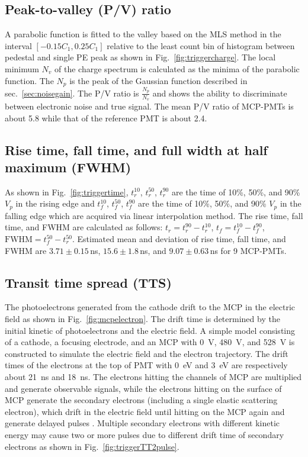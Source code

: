 \subsection{Peak-to-valley (P/V) ratio}
A parabolic function is fitted to the valley based on the MLS method in the interval $[-0.15C_1, 0.25C_1]$ relative to the least count bin of histogram between pedestal and single PE peak as shown in Fig.~\ref{fig:triggercharge}. The local minimum $N_v$ of the charge spectrum is calculated as the minima of the parabolic function. The $N_p$ is the peak of the Gaussian function described in sec.~\ref{sec:noisegain}. The P/V ratio is $\frac{N_p}{N_v}$ and shows the ability to discriminate between electronic noise and true signal. The mean P/V ratio of MCP-PMTs is about 5.8 while that of the reference PMT is about 2.4.

\subsection{Rise time, fall time, and full width at half maximum (FWHM)}
As shown in Fig.~\ref{fig:triggertime}, $t^{10}_r$, $t^{50}_r$, $t^{90}_r$ are the time of 10\%, 50\%, and 90\% $V_p$ in the rising edge and $t^{10}_f$, $t^{50}_f$, $t^{90}_f$ are the time of 10\%, 50\%, and 90\% $V_p$ in the falling edge which are acquired via linear interpolation method. The rise time, fall time, and FWHM are calculated as follows: $t_r = t^{90}_r - t^{10}_r$, $t_f = t^{10}_f - t^{90}_f$, $\mathrm{FWHM} = t^{50}_f - t^{50}_r$. Estimated mean and deviation of rise time, fall time, and FWHM are $3.71\pm0.15$\,ns, $15.6\pm1.8$\,ns, and $9.07\pm0.63$\,ns for 9 MCP-PMTs.

\subsection{Transit time spread (TTS)}
The photoelectrons generated from the cathode drift to the MCP in the electric field as shown in Fig.~\ref{fig:mcpelectron}. The drift time is determined by the initial kinetic of photoelectrons and the electric field. A simple model consisting of a cathode, a focusing electrode, and an MCP with \SI{0}{V}, \SI{480}{V}, and \SI{528}{V} is constructed to simulate the electric field and the electron trajectory. The drift times of the electrons at the top of PMT with \SI{0}{eV} and \SI{3}{eV} are respectively about \SI{21}{ns} and \SI{18}{ns}. The electrons hitting the channels of MCP are multiplied and generate observable signals, while the electrons hitting on the surface of MCP generate the secondary electrons (including a single elastic scattering electron), which drift in the electric field until hitting on the MCP again and generate delayed pulses \cite{KM3NetTesting}. Multiple secondary electrons with different kinetic energy may cause two or more pulses due to different drift time of secondary electrons as shown in Fig.~\ref{fig:triggerTT2pulse}.

